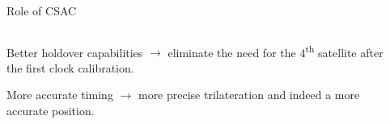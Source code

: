 




\begin{frame}{Role of CSAC}

    \begin{columns}[c, onlytextwidth]

        \begin{column}{0.55\textwidth}

            Better holdover capabilities $\rightarrow$ eliminate the need for the 4\textsuperscript{th} satellite after the first clock calibration.

            \vspace{10pt}

            More accurate timing $\rightarrow$ more precise trilateration and indeed a more accurate position.

        \end{column}

        \hfill

        \begin{column}{0.40\textwidth}


\end{column}
\end{columns}
\end{frame}
